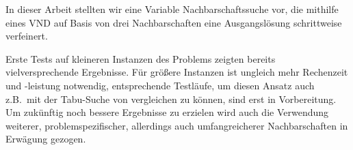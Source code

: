 \documentclass[paper=a4,fontsize=12pt]{scrartcl}
\begin{document}
In dieser Arbeit stellten wir eine Variable Nachbarschaftssuche vor, die mithilfe eines VND auf Basis von drei Nachbarschaften eine Ausgangslösung schrittweise verfeinert.

Erste Tests auf kleineren Instanzen des Problems zeigten bereits vielversprechende Ergebnisse. Für größere Instanzen ist ungleich mehr Rechenzeit und -leistung notwendig, entsprechende Testläufe, um diesen Ansatz auch z.B.\ mit der Tabu-Suche von \citet*{Noronha2006} vergleichen zu können, sind erst in Vorbereitung. Um zukünftig noch bessere Ergebnisse zu erzielen wird auch die Verwendung  weiterer, problemspezifischer, allerdings auch umfangreicherer Nachbarschaften in Erwägung gezogen.


\end{document}
